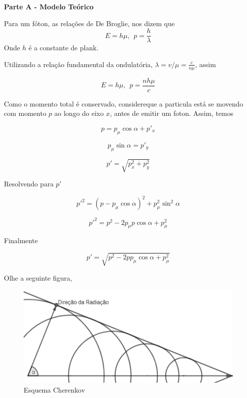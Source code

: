 \documentclass[11pt]{article}
\begin{document}
\begin{pproblem}
\begin{pssolution*}{}{}
    \begin{center}
        \textbf{Parte A - Modelo Teórico}    
    \end{center}

    \begin{alternativas}
        \item Para um fóton, as relações de De Broglie, nos dizem que 
        \[E = h\mu, \ \ p = \frac{h}{\lambda}\]
        Onde \(h\) é a constante de plank.

        Utilizando a relação fundamental da ondulatória, \(\lambda = v/\mu = \frac{c}{n\mu}\), assim 

        \[\boxed{E = h\mu, \ \ p = \frac{nh\mu}{c}}\]

        \item Como o momento total é conservado, considereque a particula está se movendo com momento \(p\) ao longo do eixo \(x\), antes de emitir um foton. Assim, temos 
        
        \[p = p_\mu\cos\alpha + p'_x\]

        \[p_\mu\sin\alpha = p'_y\]

        \[p' = \sqrt{p_x^2 + p_y^2}\]

        Resolvendo para \(p'\)

        \[p'^2 =(p - p_\mu\cos\alpha)^2 +p_\mu^2\sin^2\alpha \]

        \[p'^2 = p^2 - 2p_\mu p \cos\alpha + p_\mu^2\]

        Finalmente

        \[p' = \sqrt{p^2-2pp_\mu\cos\alpha+p^2_\mu}\]

        \item Olhe a seguinte figura, 
        
        \begin{figure}[H]
            \centering
            \includegraphics[width=0.7\linewidth]{imagens/cherenkov.1.png}
            \caption{Esquema Cherenkov}
        \end{figure}


\end{alternativas}
\end{pssolution*}
\end{pproblem}
\end{document}
